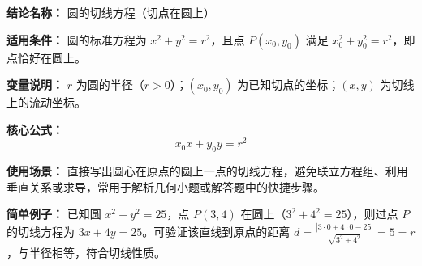 \textbf{结论名称：} 圆的切线方程（切点在圆上）

\textbf{适用条件：} 圆的标准方程为 \(x^{2}+y^{2}=r^{2}\)，且点 \(P(x_{0},y_{0})\) 满足 \(x_{0}^{2}+y_{0}^{2}=r^{2}\)，即点恰好在圆上。

\textbf{变量说明：} \(r\) 为圆的半径（\(r>0\)）；\((x_{0},y_{0})\) 为已知切点的坐标；\((x,y)\) 为切线上的流动坐标。

\textbf{核心公式：}
\[
\boxed{x_{0}x + y_{0}y = r^{2}}
\]

\textbf{使用场景：} 直接写出圆心在原点的圆上一点的切线方程，避免联立方程组、利用垂直关系或求导，常用于解析几何小题或解答题中的快捷步骤。

\textbf{简单例子：} 已知圆 \(x^{2}+y^{2}=25\)，点 \(P(3,4)\) 在圆上（\(3^{2}+4^{2}=25\)），则过点 \(P\) 的切线方程为 \(3x+4y=25\)。可验证该直线到原点的距离 \(d=\frac{|3\cdot0+4\cdot0-25|}{\sqrt{3^{2}+4^{2}}}=5=r\)，与半径相等，符合切线性质。